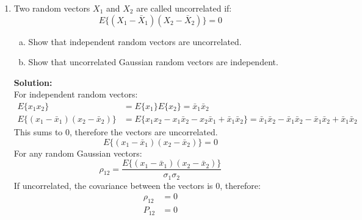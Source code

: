 \documentclass[11pt]{article}
\newcommand{\solution}{\textbf{Solution: \\}}
\begin{document}
\begin{enumerate}[label=\textbf{\arabic*.}]
  \item Two random vectors $X_1$ and $X_2$ are called uncorrelated if:
  \begin{equation*}
    E\{(X_1-\bar{X}_1)(X_2-\bar{X}_2)\} = 0
  \end{equation*}
  \begin{enumerate}[(a)]
    \itemsep -2pt
    \item Show that independent random vectors are uncorrelated.
    \item Show that uncorrelated Gaussian random vectors are independent.
  \end{enumerate}
  \solution
  For independent random vectors:
  \begin{equation*}
    \begin{split}
      E\{x_1x_2\} &= E\{x_1\}E\{x_2\} = \bar{x}_1\bar{x}_2 \\
      E\{(x_1-\bar{x}_1)(x_2-\bar{x}_2)\} &= E\{x_1x_2 - x_1\bar{x}_2 - x_2\bar{x}_1 + \bar{x}_1\bar{x}_2\} = \bar{x}_1\bar{x}_2 - \bar{x}_1\bar{x}_2 - \bar{x}_1\bar{x}_2 + \bar{x}_1\bar{x}_2
    \end{split}
  \end{equation*}
  This sums to 0, therefore the vectors are uncorrelated.
  \begin{equation*}
      E\{(x_1-\bar{x}_1)(x_2-\bar{x}_2)\} = 0
  \end{equation*}
  For any random Gaussian vectors:
  \begin{equation*}
    \rho_{12} = \dfrac{E\{(x_1-\bar{x}_1)(x_2-\bar{x}_2)\}}{\sigma_1\sigma_2}
  \end{equation*}
  If uncorrelated, the covariance between the vectors is 0, therefore:
  \begin{equation*}
    \begin{split}
      \rho_{12} &= 0 \\
      P_{12} &= 0
    \end{split}
  \end{equation*}


\end{enumerate}
\end{document}

